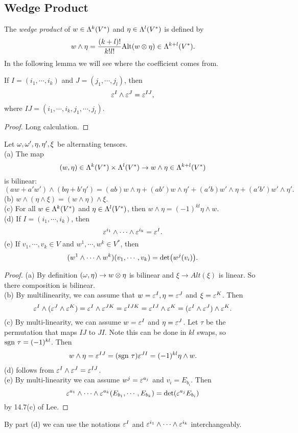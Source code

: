 \subsection{Wedge Product}
The \textit{wedge product} of $w \in \Lambda^k(V^*)$ and $\eta \in \Lambda^l(V^*)$ is defined by 
$$w \wedge \eta = \frac{(k+l)!}{k!l!}\mathrm{Alt}(w \otimes \eta) \in \Lambda^{k+l}(V^*). $$
In the following lemma we will see where the coefficient comes from. 
\begin{lemma}\label{14.10}
    If $I = (i_1,\cdots,i_k)$ and $J = (j_1,\cdots,j_l)$, then 
    $$\varepsilon^I \wedge \varepsilon^J = \varepsilon^{IJ},$$
    where $IJ = (i_1,\cdots,i_k,j_1,\cdots,j_l)$. 
\end{lemma}
\begin{proof}
    Long calculation. 
\end{proof}
\begin{proposition}\label{14.11}
Let $\omega, \omega', \eta, \eta', \xi$ be alternating tensors. \\
(a) The map $$(w,\eta) \in \Lambda^k(V^*) \times \Lambda^l(V^*) \to w \wedge \eta \in \Lambda^{k+l}(V^*)$$ is bilinear:
$$(aw+a'w') \wedge (b\eta+b'\eta') = (ab)w \wedge \eta + (ab')w \wedge \eta' + (a'b)w' \wedge \eta + (a'b')w' \wedge \eta'.$$
(b) $w \wedge (\eta \wedge \xi) = (w \wedge \eta) \wedge \xi$. \\
(c) For all $w \in \Lambda^k(V^*)$ and $\eta \in \Lambda^l(V^*)$, then $w \wedge \eta = (-1)^{kl}\eta \wedge w$. \\
(d) If $I = (i_1,\cdots,i_k)$, then 
$$\varepsilon^{i_1} \wedge \cdots \wedge \varepsilon^{i_k} = \varepsilon^I.$$
(e) If $v_1,\cdots,v_k \in V$ and $w^1,\cdots,w^k \in V^*$, then 
$$(w^1 \wedge \cdots \wedge w^k)(v_1,\cdots,v_k) = \det (w^j(v_i)). $$
\end{proposition}
\begin{proof}
    (a) By definition $(\omega,\eta) \to w \otimes \eta$ is bilinear and $\xi \to Alt(\xi)$ is linear. So there composition is bilinear. \\
    (b) By multilinearity, we can assume that $w = \varepsilon^I, \eta = \varepsilon^J$ and $\xi = \varepsilon^K$. Then 
    $$\varepsilon^I \wedge (\varepsilon^J \wedge \varepsilon^K) = \varepsilon^I \wedge \varepsilon^{JK} = \varepsilon^{IJK} = \varepsilon^{IJ} \wedge \varepsilon^K = (\varepsilon^I \wedge \varepsilon^J) \wedge \varepsilon^K. $$
    (c) By multi-linearity, we can assume $w = \varepsilon^I$ and $\eta = \varepsilon^J$. Let $\tau$ be the permutation that maps $IJ$ to $JI$. Note this can be done in $kl$ swaps, so $\mathrm{sgn~} \tau = (-1)^{kl}$. Then 
    \begin{align*}
    w \wedge \eta = \varepsilon^{IJ} = (\mathrm{sgn~} \tau) \varepsilon^{JI}
    = (-1)^{kl}\eta \wedge w. 
    \end{align*}
    (d) follows from $\varepsilon^I \wedge \varepsilon^J = \varepsilon^{IJ}$. \\
    (e) By multi-linearity we can assume $w^j = \varepsilon^{a_j}$ and $v_i = E_{b_i}$. Then 
    $$\varepsilon^{a_1} \wedge \cdots \wedge \varepsilon^{a_k}(E_{b_1},\cdots,E_{b_k}) 
    = \det 
    (\varepsilon^{a_j} E_{b_i} )
    $$ 
    by 14.7(c) of Lee. 
\end{proof}
By part (d) we can use the notations $\varepsilon^I$ and $\varepsilon^{i_1} \wedge \cdots \wedge \varepsilon^{i_k}$ interchangeably. 


